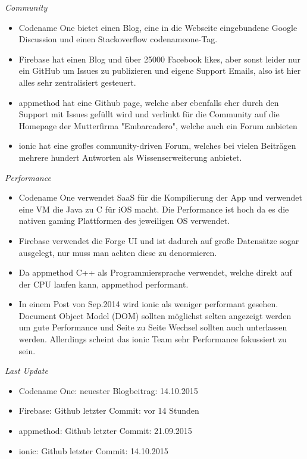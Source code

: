 \textit{Community}
\begin{itemize}
	\item Codename One bietet einen Blog, eine in die Webseite eingebundene Google Discussion und einen Stackoverflow codenameone-Tag.
	\item Firebase hat einen Blog und über 25000 Facebook likes, aber sonst leider nur ein GitHub um Issues zu publizieren und eigene Support Emails, also ist hier alles sehr zentralisiert gesteuert. 
	\item appmethod hat eine Github page, welche aber ebenfalls eher durch den Support mit Issues gefüllt wird und verlinkt für die Community auf die Homepage der Mutterfirma "Embarcadero", welche auch ein Forum anbieten
	\item ionic hat eine großes community-driven Forum, welches bei vielen Beiträgen mehrere hundert Antworten als Wissenserweiterung anbietet.
\end{itemize}

\textit{Performance}
\begin{itemize}
	\item Codename One verwendet SaaS für die Kompilierung der App und verwendet eine VM die Java zu C für iOS macht. Die Performance ist hoch da es die nativen gaming Plattformen des jeweiligen OS verwendet. 
	\item Firebase verwendet die Forge UI und ist dadurch auf große Datensätze sogar ausgelegt, nur muss man achten diese zu denormieren.
	\item Da appmethod C++ als Programmiersprache verwendet, welche direkt auf der CPU laufen kann, appmethod performant.
	\item In einem Post von Sep.2014 wird ionic als weniger performant gesehen. Document Object Model (DOM) sollten möglichst selten angezeigt werden um gute Performance und Seite zu Seite Wechsel sollten auch unterlassen werden. Allerdings scheint das ionic Team sehr Performance fokussiert zu sein.
\end{itemize}

\textit{Last Update}
\begin{itemize}
	\item Codename One: neuester Blogbeitrag: 14.10.2015
	\item Firebase: Github letzter Commit: vor 14 Stunden
	\item appmethod: Github letzter Commit: 21.09.2015
	\item ionic: Github letzter Commit: 14.10.2015
\end{itemize}

